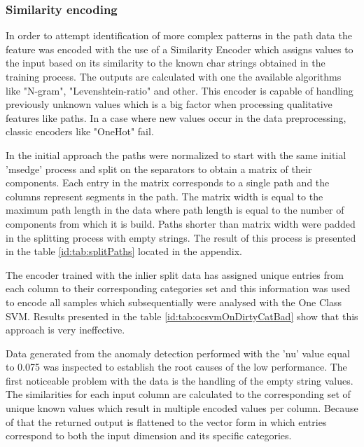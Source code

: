 \documentclass[a4paper,twoside,12pt]{book}
\begin{document}
\subsubsection{Similarity encoding}

In order to attempt identification of more complex patterns in the path data the feature was encoded with
the use of a Similarity Encoder which assigns values to the input based on its similarity 
to the known char strings obtained in the training process. The outputs are calculated with 
one the available algorithms like "N-gram", "Levenshtein-ratio" and other. This encoder is
capable of handling previously unknown values which is a big factor when processing 
qualitative features like paths. In a case where new values occur in the data preprocessing,
classic encoders like "OneHot" fail. 

In the initial approach the paths were normalized to start with the same initial 'msedge' 
process and split on the separators to obtain a matrix of their components. Each entry in the
matrix corresponds to a single path and the columns represent segments in the path. The matrix
width is equal to the maximum path length in the data where path length is equal to the number
of components from which it is build. Paths shorter than matrix width were padded in the splitting
process with empty strings. The result of this process is presented in the table \ref{id:tab:splitPaths} 
located in the appendix. 

The encoder trained with the inlier split data has assigned unique entries from each column to their 
corresponding categories set and this 
information was used to encode all samples which subsequentially were analysed with the One Class
SVM. Results presented in the table \ref{id:tab:ocsvmOnDirtyCatBad} show that this approach is 
very ineffective. 

Data generated from the anomaly detection performed with the 'nu' value equal to 0.075 was inspected 
to establish the root causes of the low performance. The first noticeable problem with the data
is the handling of the empty string values. The similarities for each input column are 
calculated to the corresponding set of unique known values which result in multiple encoded values per
column. Because of that the returned output is flattened to the vector form in which entries
correspond to both the input dimension and its specific categories. 
\end{document}
